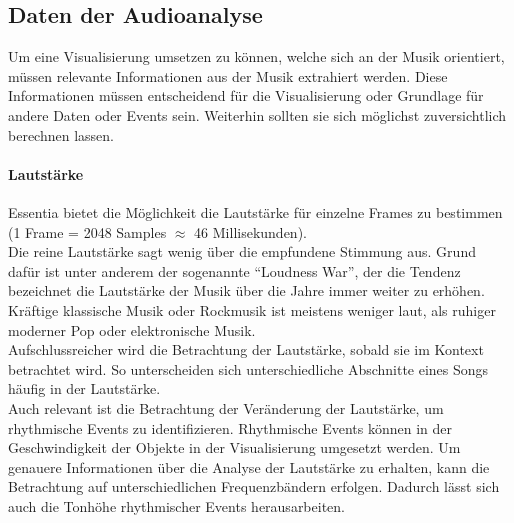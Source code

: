 \documentclass[11pt,a4paper]{article}
\begin{document}
\subsection{Daten der Audioanalyse}
Um eine Visualisierung umsetzen zu können, welche sich an der Musik orientiert, müssen relevante Informationen aus der Musik extrahiert werden. Diese Informationen müssen entscheidend für die Visualisierung oder Grundlage für andere Daten oder Events sein. Weiterhin sollten sie sich möglichst zuversichtlich berechnen lassen.

\paragraph{Lautstärke}
Essentia bietet die Möglichkeit die Lautstärke für einzelne Frames  zu bestimmen (1 Frame = 2048 Samples $\approx$ 46 Millisekunden).\\
Die reine Lautstärke sagt wenig über die empfundene Stimmung aus. Grund dafür ist unter anderem der sogenannte ``Loudness War'', der die Tendenz bezeichnet die Lautstärke der Musik über die Jahre immer weiter zu erhöhen\cite{683ea11abc74c43c6680cd4c08dc538caee546575b59c2f40d70033cf3389ec8}. Kräftige klassische Musik oder  Rockmusik ist meistens weniger laut, als ruhiger moderner Pop oder elektronische Musik.\\
Aufschlussreicher wird die Betrachtung der Lautstärke, sobald sie im Kontext betrachtet wird. So unterscheiden sich unterschiedliche Abschnitte eines Songs häufig in der Lautstärke.\\
Auch relevant ist die Betrachtung der Veränderung der Lautstärke, um rhythmische Events zu identifizieren. Rhythmische Events können in der Geschwindigkeit der Objekte in der Visualisierung umgesetzt werden. Um genauere Informationen über die Analyse der Lautstärke zu erhalten, kann die Betrachtung auf unterschiedlichen Frequenzbändern erfolgen. Dadurch lässt sich auch die Tonhöhe rhythmischer Events herausarbeiten.
\end{document}
